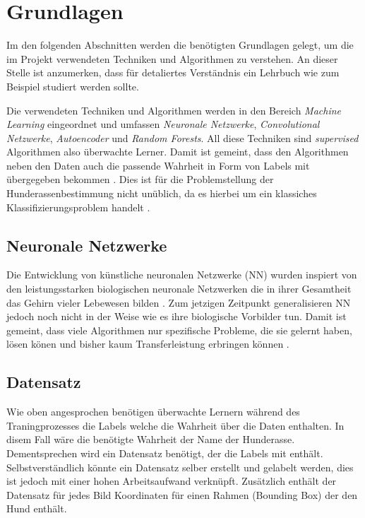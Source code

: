 \section{Grundlagen}
Im den folgenden Abschnitten werden die benötigten Grundlagen gelegt, um die
im Projekt verwendeten Techniken und Algorithmen zu verstehen. An dieser Stelle
ist anzumerken, dass für detaliertes Verständnis ein Lehrbuch
wie zum Beispiel \cite{hands_on_machine_learning} studiert werden sollte.

Die verwendeten Techniken und Algorithmen werden in den Bereich \emph{Machine
Learning} eingeordnet und umfassen \emph{Neuronale Netzwerke}, \emph{Convolutional Netzwerke},
\emph{Autoencoder} und \emph{Random Forests}. All diese Techniken sind
\emph{supervised} Algorithmen also überwachte Lerner. Damit ist gemeint, dass
den Algorithmen neben den Daten auch die passende Wahrheit in Form von Labels
mit übergegeben bekommen \cite[S. 8]{hands_on_machine_learning}. Dies ist für die
Problemstellung der Hunderassenbestimmung nicht unüblich, da es hierbei um ein
klassiches Klassifizierungsproblem handelt \cite[S. 8]{hands_on_machine_learning}.

\subsection{Neuronale Netzwerke}
Die Entwicklung von künstliche neuronalen Netzwerke (NN) wurden inspiert von den
leistungsstarken biologischen neuronale Netzwerken die in ihrer Gesamtheit
das Gehirn vieler Lebewesen bilden \cite[S. 253-256]{hands_on_machine_learning}.
Zum jetzigen Zeitpunkt generalisieren NN jedoch noch nicht in der Weise
wie es ihre biologische Vorbilder tun. Damit
ist gemeint, dass viele Algorithmen nur spezifische Probleme, die sie gelernt haben,
lösen könen und bisher kaum Transferleistung erbringen können \cite{transferleistung_netzwerke}.

\subsection{Datensatz}
Wie oben angesprochen benötigen überwachte Lernern während des Traningprozesses
die Labels welche die Wahrheit über die Daten enthalten. In disem Fall wäre die
benötigte Wahrheit der Name der Hunderasse. Dementsprechen wird ein Datensatz
benötigt, der die Labels mit enthält. Selbstverständlich könnte ein Datensatz
selber erstellt und gelabelt werden, dies ist jedoch mit einer hohen Arbeitsaufwand
verknüpft. Zusätzlich enthält der Datensatz für jedes Bild Koordinaten
für einen Rahmen (Bounding Box) der den Hund enthält.

